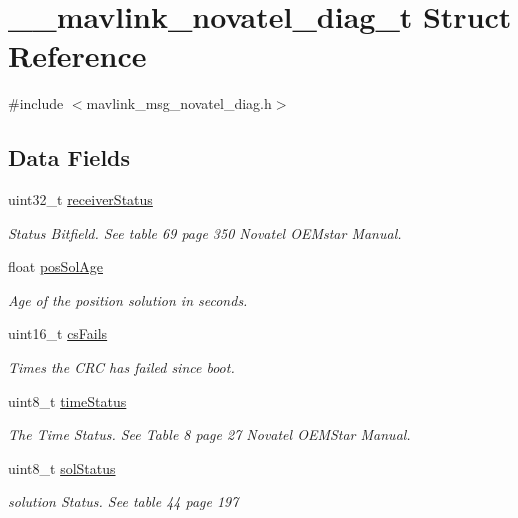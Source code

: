 \hypertarget{struct____mavlink__novatel__diag__t}{\section{\+\_\+\+\_\+mavlink\+\_\+novatel\+\_\+diag\+\_\+t Struct Reference}
\label{struct____mavlink__novatel__diag__t}
}


{\ttfamily \#include $<$mavlink\+\_\+msg\+\_\+novatel\+\_\+diag.\+h$>$}

\subsection*{Data Fields}
\begin{DoxyCompactItemize}
\item 
uint32\+\_\+t \hyperlink{struct____mavlink__novatel__diag__t_a256afd71d704c3f117f84734cc2f14fc}{receiver\+Status}
\begin{DoxyCompactList}\small\item\em Status Bitfield. See table 69 page 350 Novatel O\+E\+Mstar Manual. \end{DoxyCompactList}\item 
float \hyperlink{struct____mavlink__novatel__diag__t_a8686797075d1c2412aa4ce1dca081e02}{pos\+Sol\+Age}
\begin{DoxyCompactList}\small\item\em Age of the position solution in seconds. \end{DoxyCompactList}\item 
uint16\+\_\+t \hyperlink{struct____mavlink__novatel__diag__t_a1c89c8ef0791eb0767fd6dba460317e7}{cs\+Fails}
\begin{DoxyCompactList}\small\item\em Times the C\+R\+C has failed since boot. \end{DoxyCompactList}\item 
uint8\+\_\+t \hyperlink{struct____mavlink__novatel__diag__t_a43693f2ce0ac3c89b800d327c11bc37a}{time\+Status}
\begin{DoxyCompactList}\small\item\em The Time Status. See Table 8 page 27 Novatel O\+E\+M\+Star Manual. \end{DoxyCompactList}\item 
uint8\+\_\+t \hyperlink{struct____mavlink__novatel__diag__t_aff2e374787173642c086d502b9177b02}{sol\+Status}
\begin{DoxyCompactList}\small\item\em solution Status. See table 44 page 197 \end{DoxyCompactList}\item 

\end{DoxyCompactItemize}
